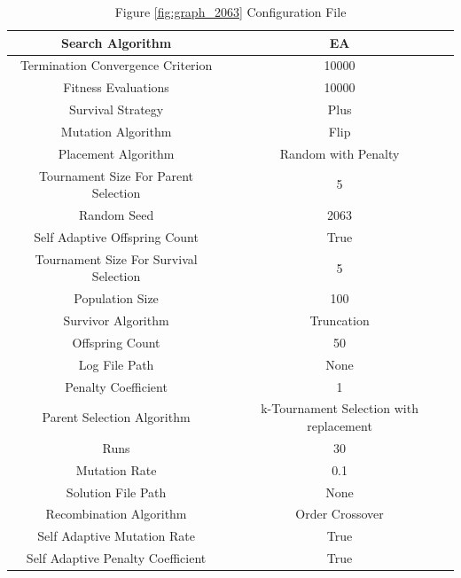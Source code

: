 \documentclass{standalone}
\begin{document}
\begin{table}[!htb]
	\centering
	\caption{Figure \ref{fig:graph_2063} Configuration File}
	\label{tab:graph_2063}
	\begin{tabular}{| c | c |}
		\hline
		Search Algorithm		& EA		 \\
		\hline
		Termination Convergence Criterion		& 10000		 \\
		\hline
		Fitness Evaluations		& 10000		 \\
		\hline
		Survival Strategy		& Plus		 \\
		\hline
		Mutation Algorithm		& Flip		 \\
		\hline
		Placement Algorithm		& Random with Penalty		 \\
		\hline
		Tournament Size For Parent Selection		& 5		 \\
		\hline
		Random Seed		& 2063		 \\
		\hline
		Self Adaptive Offspring Count		& True		 \\
		\hline
		Tournament Size For Survival Selection		& 5		 \\
		\hline
		Population Size		& 100		 \\
		\hline
		Survivor Algorithm		& Truncation		 \\
		\hline
		Offspring Count		& 50		 \\
		\hline
		Log File Path		& None		 \\
		\hline
		Penalty Coefficient		& 1		 \\
		\hline
		Parent Selection Algorithm		& k-Tournament Selection with replacement		 \\
		\hline
		Runs		& 30		 \\
		\hline
		Mutation Rate		& 0.1		 \\
		\hline
		Solution File Path		& None		 \\
		\hline
		Recombination Algorithm		& Order Crossover		 \\
		\hline
		Self Adaptive Mutation Rate		& True		 \\
		\hline
		Self Adaptive Penalty Coefficient		& True		 \\
		\hline
	\end{tabular}
\end{table}
\end{document}
